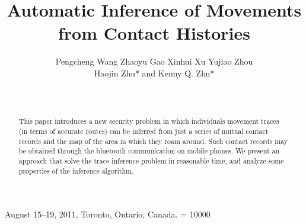 \documentclass{sig-alt-release2}
\begin{document}
%
 {August 15--19, 2011, Toronto, Ontario, Canada.} 
\widowpenalty = 10000

\title{Automatic Inference of Movements from Contact Histories}

%
\author{
%
%
\alignauthor
	Pengcheng Wang \hspace*{10pt} Zhaoyu Gao \hspace*{10pt}
	Xinhui Xu \hspace*{10pt} Yujiao Zhou \\
	Haojin Zhu* \hspace*{10pt} and \hspace*{10pt} Kenny Q. Zhu*\\
       \\
       \\
}


\maketitle
\begin{abstract}
This paper introduces a new security problem in which individuals movement
traces (in terms of accurate routes) can be inferred from just a
series of mutual contact records and the map of the area in which
they roam around. Such contact records may be obtained through
the bluetooth communication on mobile phones.
We present an approach that solve the trace inference problem
in reasonable time, and analyze some properties of the inference algorithm.
\end{abstract}
\end{document}
